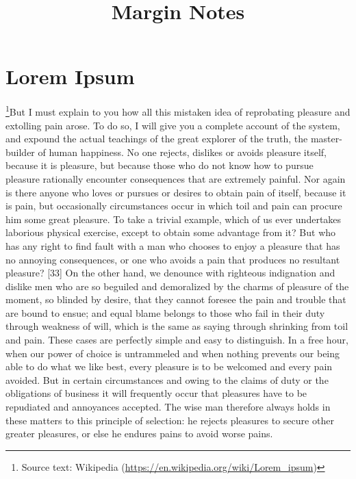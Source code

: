 \documentclass[twoside]{article} %
\title{Margin Notes}
\begin{document}
	\maketitle
	\section{Lorem Ipsum}
	\footnote{Source text: Wikipedia (\url{https://en.wikipedia.org/wiki/Lorem_ipsum})}But I must explain to you how all this mistaken idea of reprobating pleasure and extolling pain arose. To do so, I will give you a complete account of the system, and expound the actual teachings of the great explorer of the truth, the master-builder of human happiness.  No one rejects, dislikes or avoids pleasure itself, because it is pleasure, but because those who do not know how to pursue pleasure rationally encounter consequences that are extremely painful. Nor again is there anyone who loves or pursues or desires to obtain pain of itself, because it is pain, but occasionally circumstances occur in which toil and pain can procure him some great pleasure.   To take a trivial example, which of us ever undertakes laborious physical exercise, except to obtain some advantage from it? But who has any right to find fault with a man who chooses to enjoy a pleasure that has no annoying consequences, or one who avoids a pain that produces no resultant pleasure? [33] On the other hand, we denounce with righteous indignation and dislike men who are so beguiled and demoralized by the charms of pleasure of the moment, so blinded by desire, that they cannot foresee the pain and trouble that are bound to ensue; and equal blame belongs to those who fail in their duty through weakness of will, which is the same as saying through shrinking from toil and pain. These cases are perfectly simple and easy to distinguish. In a free hour, when our power of choice is untrammeled and when nothing prevents our being able to do what we like best, every pleasure is to be welcomed and every pain avoided. But in certain circumstances and owing to the claims of duty or the obligations of business it will frequently occur that pleasures have to be repudiated and annoyances accepted.  The wise man therefore always holds in these matters to this principle of selection: he rejects pleasures to secure other greater pleasures, or else he endures pains to avoid worse pains.
\end{document}
